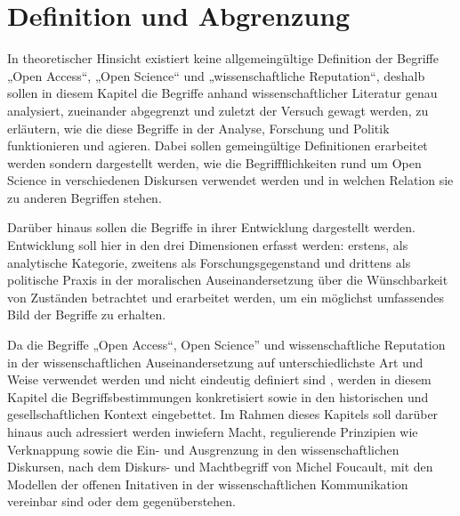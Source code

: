 \chapter{Definition und Abgrenzung} 
In theoretischer Hinsicht existiert keine allgemeingültige Definition der Begriffe „Open Access“, „Open Science“ und „wissenschaftliche Reputation“, deshalb sollen in diesem Kapitel die Begriffe anhand wissenschaftlicher Literatur genau analysiert, zueinander abgegrenzt und zuletzt der Versuch gewagt werden, zu erläutern, wie die diese Begriffe in der Analyse, Forschung und Politik funktionieren und agieren. Dabei sollen gemeingültige Definitionen erarbeitet werden sondern dargestellt werden, wie die Begriffflichkeiten rund um Open Science in verschiedenen Diskursen verwendet werden und in welchen Relation sie zu anderen Begriffen stehen.

Darüber hinaus sollen die Begriffe in ihrer Entwicklung dargestellt werden. Entwicklung soll hier in den drei Dimensionen erfasst werden: erstens, als analytische Kategorie, zweitens als Forschungsgegenstand und drittens als politische Praxis in der moralischen Auseinandersetzung über die Wünschbarkeit von Zuständen betrachtet und erarbeitet werden, um ein möglichst umfassendes Bild der Begriffe zu erhalten. \cite{cite:10}

Da die Begriffe „Open Access“, Open Science” und wissenschaftliche Reputation in der wissenschaftlichen Auseinandersetzung auf unterschiedlichste Art und Weise verwendet werden und nicht eindeutig definiert sind \cite{cite:9}, werden in diesem Kapitel die Begriffsbestimmungen konkretisiert sowie in den historischen und gesellschaftlichen Kontext eingebettet.
Im Rahmen dieses Kapitels soll darüber hinaus auch adressiert werden inwiefern Macht, regulierende Prinzipien wie Verknappung sowie die Ein- und Ausgrenzung in den wissenschaftlichen Diskursen, nach dem Diskurs- und Machtbegriff  von Michel Foucault, mit den Modellen der offenen Initativen in der wissenschaftlichen Kommunikation vereinbar sind oder dem gegenüberstehen.
